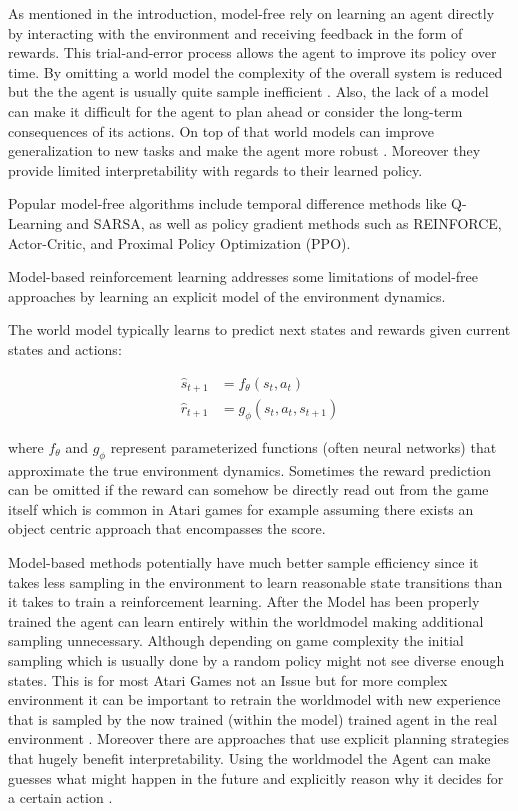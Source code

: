 \documentclass[
	english,
	ruledheaders=section,
	class=report,
	thesis={type=master},
	accentcolor=9c,
	custommargins=true,
	marginpar=false,
	parskip=half-,
	fontsize=11pt,
]{tudapub}
\begin{document}
As mentioned in the introduction, model-free rely on learning an agent directly
by interacting with the environment and receiving feedback in the form of
rewards. This trial-and-error process allows the agent to improve its policy
over time. By omitting a world model the complexity of the overall system is
reduced but the the agent is usually quite sample inefficient
\cite{duan2016benchmarking,kaiser2019model}. Also, the lack of a model can make
it difficult for the agent to plan ahead or consider the long-term consequences
of its actions. On top of that world models can improve generalization to new
tasks and make the agent more robust \cite{ha2018world,hafner2020dream}.
Moreover they provide limited interpretability with regards to their learned
policy.

Popular model-free algorithms include temporal difference methods like
Q-Learning and SARSA, as well as policy gradient methods such as REINFORCE,
Actor-Critic, and Proximal Policy Optimization (PPO).

Model-based reinforcement learning addresses some limitations of model-free
approaches by learning an explicit model of the environment dynamics.

The world model typically learns to predict next states and rewards given
current states and actions:

\begin{align}
	\hat{s}_{t+1} & = f_\theta(s_t, a_t)        \\
	\hat{r}_{t+1} & = g_\phi(s_t, a_t, s_{t+1})
\end{align}

where $f_\theta$ and $g_\phi$ represent parameterized functions (often neural
networks) that approximate the true environment dynamics. Sometimes the reward
prediction can be omitted if the reward can somehow be directly read out from
the game itself which is common in Atari games for example assuming there
exists an object centric approach that encompasses the score.

Model-based methods potentially have much better sample efficiency since it
takes less sampling in the environment to learn reasonable state transitions
than it takes to train a reinforcement learning. After the Model has been
properly trained the agent can learn entirely within the worldmodel making
additional sampling unnecessary. Although depending on game complexity the
initial sampling which is usually done by a random policy might not see diverse
enough states. This is for most Atari Games not an Issue but for more complex
environment it can be important to retrain the worldmodel with new experience
that is sampled by the now trained (within the model) trained agent in the real
environment \cite{janner2019trust,sutton1991dyna}. Moreover there are
approaches that use explicit planning strategies that hugely benefit
interpretability. Using the worldmodel the Agent can make guesses what might
happen in the future and explicitly reason why it decides for a certain action
\cite{schrittwieser2020mastering,greydanus2018visualizing}.
\end{document}
